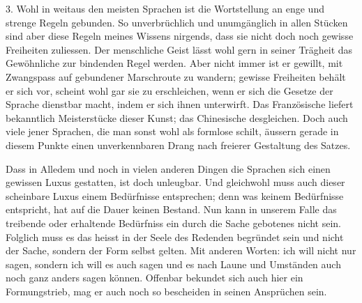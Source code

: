 3. Wohl in weitaus den meisten Sprachen ist die Wortstellung an enge und strenge Regeln gebunden. So unverbrüchlich und unumgänglich in allen Stücken sind aber diese Regeln meines Wissens nirgends, dass sie nicht doch noch gewisse Freiheiten zuliessen. Der menschliche Geist lässt wohl gern in seiner Trägheit das Gewöhnliche zur bindenden Regel werden. Aber nicht immer ist er gewillt, mit Zwangspass auf gebundener Marschroute zu wandern; gewisse Freiheiten behält er sich vor, scheint wohl gar sie zu erschleichen, wenn er sich die Gesetze der Sprache dienstbar macht, indem er sich ihnen unterwirft. Das Französische liefert bekanntlich Meisterstücke dieser Kunst; das Chinesische desgleichen. Doch auch viele jener Sprachen, die man sonst wohl \label{sp.364} als formlose schilt, äussern gerade in diesem Punkte einen unverkennbaren Drang nach freierer Gestaltung des Satzes.

\label{fp.347}

Dass in Alledem und noch in vielen anderen Dingen die Sprachen sich einen gewissen Luxus gestatten, ist doch unleugbar. Und gleichwohl muss auch dieser scheinbare Luxus einem Bedürfnisse entsprechen; denn was keinem Bedürfnisse entspricht, hat auf die Dauer keinen Bestand. Nun kann in unserem Falle das treibende oder erhaltende Bedürfniss ein  durch die Sache gebotenes nicht sein. Folglich muss es  das heisst in der Seele des Redenden begründet sein und nicht der Sache, sondern der Form selbst gelten. Mit anderen Worten: ich will nicht nur  sagen, sondern ich will es auch  sagen und es nach Laune und Umständen auch noch ganz anders sagen können. Offenbar bekundet sich auch hier ein Formungstrieb, mag er auch noch so bescheiden in seinen Ansprüchen sein.

